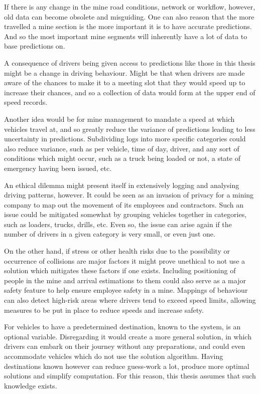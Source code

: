 \documentclass{article}
\begin{document}
		If there is any change in the mine road conditions, network or workflow, however, old data can become obsolete and misguiding. One can also reason that the more travelled a mine section is the more important it is to have accurate predictions. And so the most important mine segments will inherently have a lot of data to base predictions on.

		A consequence of drivers being given access to predictions like those in this thesis might be a change in driving behaviour. Might be that when drivers are made aware of the chances to make it to a meeting slot that they would speed up to increase their chances, and so a collection of data would form at the upper end of speed records.

		Another idea would be for mine management to mandate a speed at which vehicles travel at, and so greatly reduce the variance of predictions leading to less uncertainty in predictions. Subdividing logs into more specific categories could also reduce variance, such as per vehicle, time of day, driver, and any sort of conditions which might occur, such as a truck being loaded or not, a state of emergency having been issued, etc.

		An ethical dilemma might present itself in extensively logging and analysing driving patterns, however. It could be seen as an invasion of privacy for a mining company to map out the movement of its employees and contractors. Such an issue could be mitigated somewhat by grouping vehicles together in categories, such as loaders, trucks, drills, etc. Even so, the issue can arise again if the number of drivers in a given category is very small, or even just one.

		On the other hand, if stress or other health risks due to the possibility or occurrence of collisions are major factors it might prove unethical to not use a solution which mitigates these factors if one exists. Including positioning of people in the mine and arrival estimations to them could also serve as a major safety feature to help ensure employee safety in a mine. Mappings of behaviour can also detect high-risk areas where drivers tend to exceed speed limits, allowing measures to be put in place to reduce speeds and increase safety.

		For vehicles to have a predetermined destination, known to the system, is an optional variable. Disregarding it would create a more general solution, in which drivers can embark on their journey without any preparations, and could even accommodate vehicles which do not use the solution algorithm. Having destinations known however can reduce guess-work a lot, produce more optimal solutions and simplify computation. For this reason, this thesis assumes that such knowledge exists.
\end{document}
